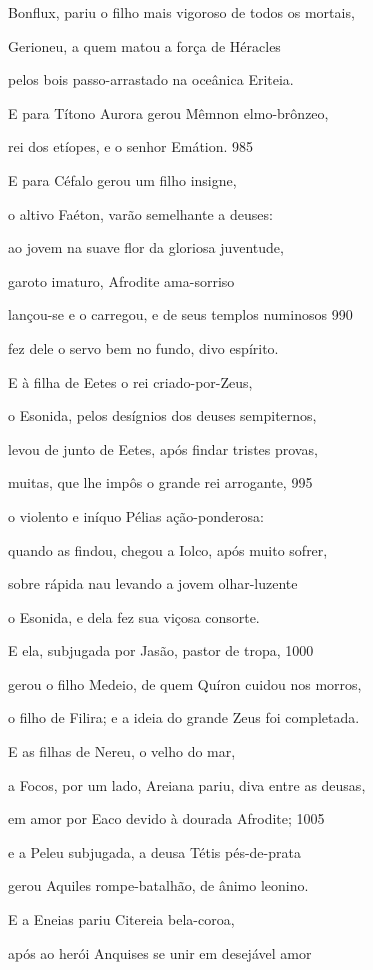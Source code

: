 Bonflux, pariu o filho mais vigoroso de todos os mortais,

Gerioneu, a quem matou a força de Héracles

pelos bois passo-arrastado na oceânica Eriteia.

\quad{}E para Títono Aurora gerou Mêmnon elmo-brônzeo,

rei dos etíopes, e o senhor Emátion. \num{985}

E para Céfalo gerou um filho insigne,

o altivo Faéton, varão semelhante a deuses:

ao jovem na suave flor da gloriosa juventude,

garoto imaturo, Afrodite ama-sorriso

lançou-se e o carregou, e de seus templos numinosos \num{990}

fez dele o servo bem no fundo, divo espírito.

\quad{}E à filha de Eetes o rei criado-por-Zeus,

o Esonida, pelos desígnios dos deuses sempiternos,

levou de junto de Eetes, após findar tristes provas,

muitas, que lhe impôs o grande rei arrogante, \num{995}

o violento e iníquo Pélias ação-ponderosa:

quando as findou, chegou a Iolco, após muito sofrer,

sobre rápida nau levando a jovem olhar-luzente

o Esonida, e dela fez sua viçosa consorte.

E ela, subjugada por Jasão, pastor de tropa, \num{1000}

gerou o filho Medeio, de quem Quíron cuidou nos morros,

o filho de Filira; e a ideia do grande Zeus foi completada.

\quad{}E as filhas de Nereu, o velho do mar,

a Focos, por um lado, Areiana pariu, diva entre as deusas,

em amor por Eaco devido à dourada Afrodite; \num{1005}

e a Peleu subjugada, a deusa Tétis pés-de-prata

gerou Aquiles rompe-batalhão, de ânimo leonino.

\quad{}E a Eneias pariu Citereia bela-coroa,

após ao herói Anquises se unir em desejável amor

